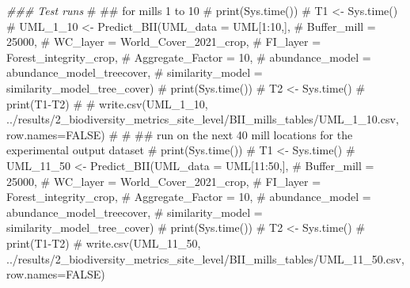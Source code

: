 \documentclass[
  letterpaper,
  DIV=11,
  numbers=noendperiod]{scrartcl}
\newenvironment{Shaded}{\begin{snugshade}}{\end{snugshade}}
\newcommand{\CommentTok}[1]{\textcolor[rgb]{0.37,0.37,0.37}{#1}}
\newcommand{\DocumentationTok}[1]{\textcolor[rgb]{0.37,0.37,0.37}{\textit{#1}}}
\begin{document}
\begin{Shaded}
\begin{Highlighting}[]
\DocumentationTok{\#\#\# Test runs}
\CommentTok{\# \#\# for mills 1 to 10}
\CommentTok{\# print(Sys.time())}
\CommentTok{\# T1 \textless{}{-} Sys.time()}
\CommentTok{\# UML\_1\_10 \textless{}{-} Predict\_BII(UML\_data = UML[1:10,], }
\CommentTok{\#                     Buffer\_mill = 25000, }
\CommentTok{\#                     WC\_layer = World\_Cover\_2021\_crop,}
\CommentTok{\#                     FI\_layer = Forest\_integrity\_crop, }
\CommentTok{\#                     Aggregate\_Factor = 10,}
\CommentTok{\#                     abundance\_model = abundance\_model\_treecover, }
\CommentTok{\#                     similarity\_model = similarity\_model\_tree\_cover)}
\CommentTok{\# print(Sys.time())}
\CommentTok{\# T2 \textless{}{-} Sys.time()}
\CommentTok{\# print(T1{-}T2)}
\CommentTok{\# }
\CommentTok{\# write.csv(UML\_1\_10, \textquotesingle{}../results/2\_biodiversity\_metrics\_site\_level/BII\_mills\_tables/UML\_1\_10.csv\textquotesingle{}, row.names=FALSE)}
\CommentTok{\# }
\CommentTok{\# \#\# run on the next 40 mill locations for the experimental output dataset}
\CommentTok{\# print(Sys.time())}
\CommentTok{\# T1 \textless{}{-} Sys.time()}
\CommentTok{\# UML\_11\_50 \textless{}{-} Predict\_BII(UML\_data = UML[11:50,], }
\CommentTok{\#                     Buffer\_mill = 25000, }
\CommentTok{\#                     WC\_layer = World\_Cover\_2021\_crop,}
\CommentTok{\#                     FI\_layer = Forest\_integrity\_crop, }
\CommentTok{\#                     Aggregate\_Factor = 10,}
\CommentTok{\#                     abundance\_model = abundance\_model\_treecover, }
\CommentTok{\#                     similarity\_model = similarity\_model\_tree\_cover)}
\CommentTok{\# print(Sys.time())}
\CommentTok{\# T2 \textless{}{-} Sys.time()}
\CommentTok{\# print(T1{-}T2) }
\CommentTok{\# write.csv(UML\_11\_50, \textquotesingle{}../results/2\_biodiversity\_metrics\_site\_level/BII\_mills\_tables/UML\_11\_50.csv\textquotesingle{}, row.names=FALSE)}


\end{Highlighting}
\end{Shaded}
\end{document}
